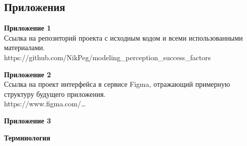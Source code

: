 \documentclass{article}
\newcommand\zz[1]{\par{\normalsize\strut #1} \hfill\ignorespaces}
\begin{document}
    \newpage
    \begin{center}
        \section*{Приложения}
    \end{center}
    \zz{}\textbf{Приложение 1\\}
    Ссылка на репозиторий проекта с исходным кодом и всеми использованными материалами.\\
    https://github.com/NikPeg/modeling\_perception\_success\_factors\\
    \zz{}\textbf{Приложение 2\\}
    Ссылка на проект интерфейса в сервисе Figma, отражающий примерную структуру будущего приложения.\\
    https://www.figma.com/\ldots\\
    \zz{}\textbf{Приложение 3\\}
    \zz{}\textbf{Терминология\\}
\end{document}
